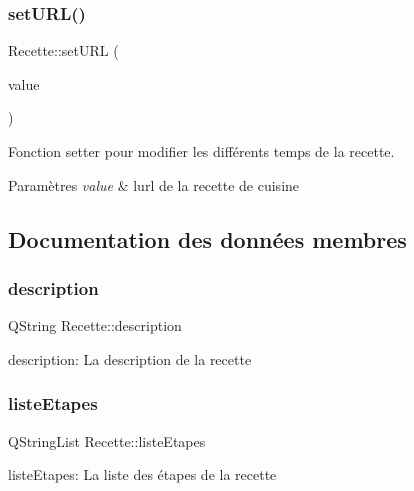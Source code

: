 \subsubsection{\texorpdfstring{set\+U\+R\+L()}{setURL()}}
{\footnotesize\ttfamily Recette\+::set\+U\+RL (\begin{DoxyParamCaption}\item[{const Q\+String \&}]{value }\end{DoxyParamCaption})}



Fonction setter pour modifier les différents temps de la recette. 


\begin{DoxyParams}{Paramètres}
{\em value} & l\textquotesingle{}url de la recette de cuisine \\
\hline
\end{DoxyParams}


\subsection{Documentation des données membres}
\mbox{\label{classRecette_a140933cc7041efba084ccc66a6dc666a}} 
\subsubsection{\texorpdfstring{description}{description}}
{\footnotesize\ttfamily Q\+String Recette\+::description\hspace{0.3cm}{\ttfamily [private]}}

description\+: La description de la recette \mbox{\label{classRecette_addbf40a642849e6583ac7fd3e2059e0d}} 
\subsubsection{\texorpdfstring{liste\+Etapes}{listeEtapes}}
{\footnotesize\ttfamily Q\+String\+List Recette\+::liste\+Etapes\hspace{0.3cm}{\ttfamily [private]}}

liste\+Etapes\+: La liste des étapes de la recette \mbox{\label{classRecette_ab90a69f52a2250e1f49c4ac52b364adf}} 

